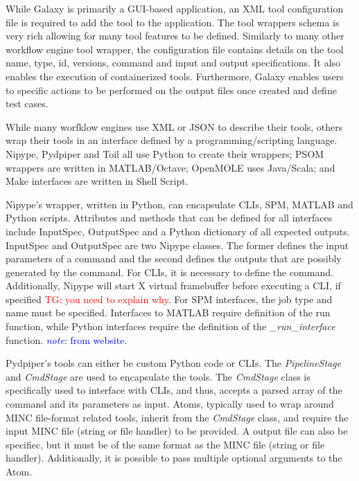 \documentclass{report}
\newcommand{\note}[1]{\textcolor{blue}{\textit{note}: #1}}
\newcommand{\tristan}[1]{\textcolor{red}{TG: #1}}
\begin{document}
            While Galaxy is primarily a GUI-based application, an XML tool
            configuration file is required to add the tool to the application.
            The tool wrappers schema is very rich allowing for many tool 
            features to be defined. Similarly to many other workflow engine tool
            wrapper, the configuration file contains details on the tool name, 
            type, id, versions, command and input and output specifications. It
            also enables the execution of containerized tools. Furthermore,
            Galaxy enables users to specific actions to be performed on the 
            output files once created and define test cases.

            While many worfklow engines use XML or JSON to describe their tools,
            others wrap their tools in an interface defined by a
            programming/scripting language. Nipype, Pydpiper and Toil all use
            Python to create their wrappers; PSOM wrappers are written in
            MATLAB/Octave; OpenMOLE uses Java/Scala; and Make interfaces are
            written in Shell Script.

            Nipype's wrapper, written in Python, can encapsulate CLIs, SPM, 
            MATLAB and Python scripts. Attributes and methods that can be 
            defined for all interfaces include InputSpec, OutputSpec and a 
            Python dictionary of all expected outputs. InputSpec and OutputSpec
            are two Nipype classes. The former defines the input parameters of 
            a command and the second defines the outputs that are possibly 
            generated by the command. For CLIs, it is necessary to define the
            command. Additionally, Nipype will start X virtual framebuffer 
            before executing a CLI, if specified \tristan{you need to explain why}. For SPM interfaces, the job 
            type and name must be specified. Interfaces to MATLAB require 
            definition of the run function, while Python interfaces require
            the definition of the \textit{\_run\_interface} function. \note{from
            website}.

            Pydpiper's tools can either be custom Python code or CLIs. The 
            \textit{PipelineStage} and \textit{CmdStage} are used to 
            encapsulate the tools. The \textit{CmdStage} class is specifically 
            used to interface with CLIs, and thus, accepts a parsed array of the
            command and its parameters as input. Atoms, typically used to wrap
            around MINC file-format related tools, inherit from the
            \textit{CmdStage} class, and require the input MINC file (string or
            file handler) to be provided. A output file can also be specifiec, 
            but it must be of the same format as the MINC file (string or file 
            handler). Additionally, it is possible to pass multiple optional 
            arguments to the Atom.
\end{document}
